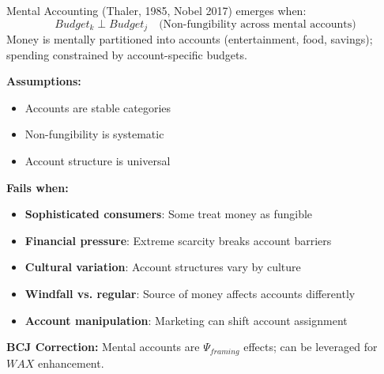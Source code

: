 
\begin{theorem}
\label{thm:mental-accounting}
Mental Accounting (Thaler, 1985, Nobel 2017) emerges when:
\begin{equation}
\boxed{Budget_k \perp Budget_j \quad \text{(Non-fungibility across mental accounts)}}
\end{equation}
Money is mentally partitioned into accounts (entertainment, food, savings); spending constrained by account-specific budgets.
\end{theorem}

\begin{tcolorbox}[colback=red!5!white, colframe=red!75!black, title=Boundary Condition: Where Mental Accounting Fails]
\textbf{Assumptions:}
\begin{itemize}[nosep]
\item Accounts are stable categories
\item Non-fungibility is systematic
\item Account structure is universal
\end{itemize}

\textbf{Fails when:}
\begin{itemize}[nosep]
\item \textbf{Sophisticated consumers}: Some treat money as fungible
\item \textbf{Financial pressure}: Extreme scarcity breaks account barriers
\item \textbf{Cultural variation}: Account structures vary by culture
\item \textbf{Windfall vs. regular}: Source of money affects accounts differently
\item \textbf{Account manipulation}: Marketing can shift account assignment
\end{itemize}

\textbf{BCJ Correction:} Mental accounts are $\Psi_{framing}$ effects; can be leveraged for $WAX$ enhancement.
\end{tcolorbox}


